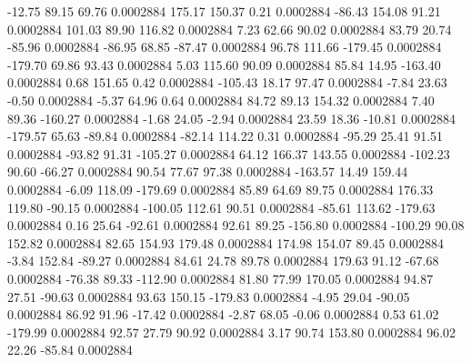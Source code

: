       -12.75       89.15       69.76     0.0002884
      175.17      150.37        0.21     0.0002884
      -86.43      154.08       91.21     0.0002884
      101.03       89.90      116.82     0.0002884
        7.23       62.66       90.02     0.0002884
       83.79       20.74      -85.96     0.0002884
      -86.95       68.85      -87.47     0.0002884
       96.78      111.66     -179.45     0.0002884
     -179.70       69.86       93.43     0.0002884
        5.03      115.60       90.09     0.0002884
       85.84       14.95     -163.40     0.0002884
        0.68      151.65        0.42     0.0002884
     -105.43       18.17       97.47     0.0002884
       -7.84       23.63       -0.50     0.0002884
       -5.37       64.96        0.64     0.0002884
       84.72       89.13      154.32     0.0002884
        7.40       89.36     -160.27     0.0002884
       -1.68       24.05       -2.94     0.0002884
       23.59       18.36      -10.81     0.0002884
     -179.57       65.63      -89.84     0.0002884
      -82.14      114.22        0.31     0.0002884
      -95.29       25.41       91.51     0.0002884
      -93.82       91.31     -105.27     0.0002884
       64.12      166.37      143.55     0.0002884
     -102.23       90.60      -66.27     0.0002884
       90.54       77.67       97.38     0.0002884
     -163.57       14.49      159.44     0.0002884
       -6.09      118.09     -179.69     0.0002884
       85.89       64.69       89.75     0.0002884
      176.33      119.80      -90.15     0.0002884
     -100.05      112.61       90.51     0.0002884
      -85.61      113.62     -179.63     0.0002884
        0.16       25.64      -92.61     0.0002884
       92.61       89.25     -156.80     0.0002884
     -100.29       90.08      152.82     0.0002884
       82.65      154.93      179.48     0.0002884
      174.98      154.07       89.45     0.0002884
       -3.84      152.84      -89.27     0.0002884
       84.61       24.78       89.78     0.0002884
      179.63       91.12      -67.68     0.0002884
      -76.38       89.33     -112.90     0.0002884
       81.80       77.99      170.05     0.0002884
       94.87       27.51      -90.63     0.0002884
       93.63      150.15     -179.83     0.0002884
       -4.95       29.04      -90.05     0.0002884
       86.92       91.96      -17.42     0.0002884
       -2.87       68.05       -0.06     0.0002884
        0.53       61.02     -179.99     0.0002884
       92.57       27.79       90.92     0.0002884
        3.17       90.74      153.80     0.0002884
       96.02       22.26      -85.84     0.0002884
